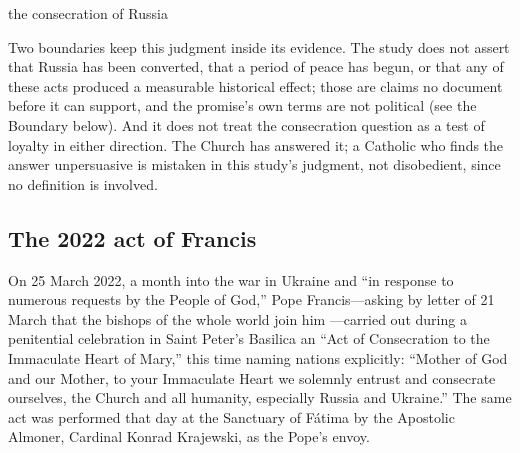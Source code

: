 \begin{synthesis}{the consecration of Russia}
\end{synthesis}

Two boundaries keep this judgment inside its evidence. The study does
not assert that Russia has been converted, that a period of peace has
begun, or that any of these acts produced a measurable historical
effect; those are claims no document before it can support, and the
promise's own terms are not political (see the Boundary below). And
it does not treat the
consecration question as a test of loyalty in either direction. The
Church has answered it; a Catholic who finds the answer unpersuasive
is mistaken in this study's judgment, not disobedient, since no
definition is involved.

\subsection{The 2022 act of Francis}

On 25 March 2022, a month into the war in Ukraine and ``in response
to numerous requests by the People of God,'' Pope Francis---asking by
letter of 21 March that the bishops of the whole world join him
---carried out during a penitential celebration in Saint Peter's
Basilica an ``Act of Consecration to the Immaculate Heart of Mary,''
this time naming nations explicitly: ``Mother of God and our Mother,
to your Immaculate Heart we solemnly entrust and consecrate
ourselves, the Church and all humanity, especially Russia and
Ukraine.'' The same act was performed that day at the
Sanctuary of F\'atima by the Apostolic Almoner, Cardinal Konrad
Krajewski, as the Pope's envoy.


